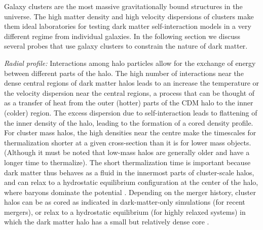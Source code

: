 
Galaxy clusters are the most massive gravitationally bound structures in the universe. The high matter density and high velocity dispersions of clusters make them ideal laboratories for testing dark matter self-interaction models in a very different regime from individual galaxies.
In the following section we discuss several probes that use galaxy clusters to constrain the nature of dark matter.

\vspace{1em} 



\emph{Radial profile: }Interactions among halo particles allow for the exchange of energy between different parts of the halo. The high number of interactions near the dense central regions of dark matter halos leads to an increase the temperature or the velocity dispersion near the central regions, a process that can be thought of as a transfer of heat from the outer (hotter) parts of the CDM halo to the inner (colder) region. The excess dispersion due to self-interaction leads to flattening of the inner density of the halo, leading to the formation of a cored density profile. For cluster mass halos, the high densities near the centre make the timescales for thermalization shorter at a given cross-section than it is for lower mass objects. (Although it must be noted that low-mass halos are generally older and have a longer time to thermalize).  The short thermalization time is important because dark matter thus behaves as a fluid in the innermost parts of cluster-scale halos, and can relax to a hydrostatic equilibrium configuration at the center of the halo, where baryons dominate the potential \citep{Kaplinghat:2015aga}.  Depending on the merger history, cluster halos can be as cored as indicated in dark-matter-only simulations (for recent mergers), or relax to a hydrostatic equilibrium (for highly relaxed systems) in which the dark matter halo has a small but relatively dense core \citep{Robertson:2017mgj}.

